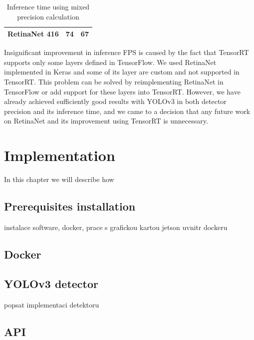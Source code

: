 \documentclass[twoside]{ctuthesis}
\theoremstyle{plain}
\theoremstyle{definition}
\theoremstyle{note}
\begin{document}
\begin{table}[hbt]
\begin{tabular}{|c|c|c|}
RetinaNet 416                                            & 74                                                                                                                            & 67                                                                                                                                  \\ \hline
\end{tabular}
\caption{Inference time using mixed precision calculation}
\label{inference_time_mixed}
\end{table}
Insignificant improvement in inference FPS is caused by the fact that TensorRT supports only some layers defined in TensorFlow. We used RetinaNet implemented in Keras and some of its layer are custom and not supported in TensorRT. This problem can be solved by reimplementing RetinaNet in TensorFlow or add support for these layers into TensorRT.  However, we have already achieved sufficiently good results with YOLOv3 in both detector precision and its inference time, and we came to a decision that any future work on RetinaNet and its improvement using TensorRT is unnecessary. 
                                                                                        
                                                                                
\chapter{Implementation}

In this chapter we will describe how 
\section{Prerequisites installation}
instalace software, docker, prace s grafickou kartou jetson uvnitr dockeru
\subsection{}
\section{Docker}
\section{YOLOv3 detector}
popsat implementaci detektoru
\section{API}
\end{document}
